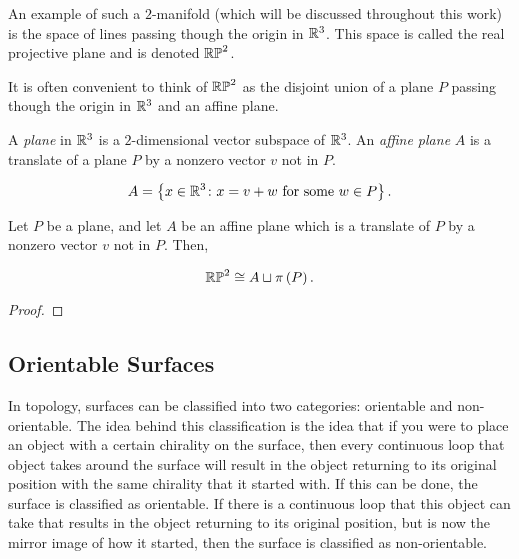 \documentclass{amsart}
\begin{document}
	An example of such a $2$-manifold (which will be discussed throughout this work) is the space of lines passing though the origin in $\mathbb{R}^3$. This space is called the real projective plane and is denoted $\mathbb{RP}^2$.
	
	It is often convenient to think of $\mathbb{RP}^2$ as the disjoint union of a plane $P$ passing though the origin in $\mathbb{R}^3$ and an affine plane.
	
	\begin{definition}
		\label{def:plane-affine}
		A \emph{plane} in $\mathbb{R}^3$ is a $2$-dimensional vector subspace of $\mathbb{R}^3$. An \emph{affine plane} $A$ is a translate of a plane $P$ by a nonzero vector $v$ not in $P$. 
		
		\begin{equation*}
			A = \left\{x \in \mathbb{R}^3 \colon x = v + w \text{ for some } w \in P\right\}.
		\end{equation*}
	\end{definition}
	
	
	\begin{lemma}
		Let $P$ be a plane, and let $A$ be an affine plane which is a translate of $P$ by a nonzero vector $v$ not in $P$. Then,
		
		\begin{equation*}
			\mathbb{RP}^2 \cong A \sqcup \pi\left(P\right).
		\end{equation*}
	\end{lemma}
	
	\begin{proof}
		
	\end{proof}
	
	\subsection{Orientable Surfaces}
	
	In topology, surfaces can be classified into two categories: orientable and non-orientable. The idea behind this classification is the idea that if you were to place an object with a certain chirality on the surface, then every continuous loop that object takes around the surface will result in the object returning to its original position with the same chirality that it started with. If this can be done, the surface is classified as orientable. If there is a continuous loop that this object can take that results in the object returning to its original position, but is now the mirror image of how it started, then the surface is classified as non-orientable. 
	
\end{document}

